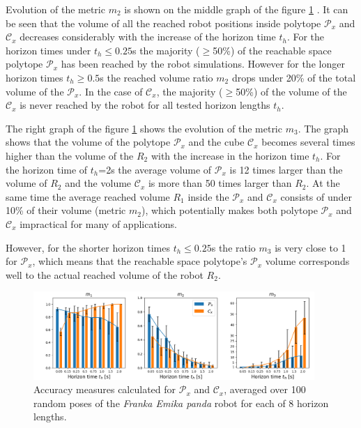 Evolution of the metric $m_2$ is shown on the middle graph of the figure \ref{fig:accuracy} . It can be seen that the volume of all the reached robot positions inside polytope $\mathcal{P}_x$ and $\mathcal{C}_x$ decreases considerably with the increase of the horizon time $t_h$. For the horizon times under $t_h\leq 0.25$s the majority ($\geq$50\%) of the reachable space polytope $\mathcal{P}_x$ has been reached by the robot simulations. However for the longer horizon times $t_h\geq0.5$s the reached volume ratio $m_2$ drops under 20\% of the total volume of the $\mathcal{P}_x$. In the case of $\mathcal{C}_x$, the majority ($\geq$50\%)  of the volume of the $\mathcal{C}_x$ is never reached by the robot for all tested horizon lengths $t_h$. 


The right graph of the figure \ref{fig:accuracy} shows the evolution of the metric $m_3$. The graph shows that the volume of the polytope $\mathcal{P}_x$ and the cube $\mathcal{C}_x$ becomes several times higher than the volume of the $R_2$ with the increase in the horizon time $t_h$. For the horizon time of $t_h$=2s the average volume of $\mathcal{P}_x$ is 12 times larger than the volume of $R_2$ and the volume $\mathcal{C}_x$ is more than 50 times larger than $R_2$. At the same time the average reached volume $R_1$ inside the $\mathcal{P}_x$ and $\mathcal{C}_x$ consists of under 10\% of their volume (metric $m_2$), which potentially makes both polytope $\mathcal{P}_x$ and $\mathcal{C}_x$ impractical for many of applications. 

However, for the shorter horizon times $t_h\leq0.25$s the ratio $m_3$ is very close to 1 for $\mathcal{P}_x$, which means that the reachable space polytope's $\mathcal{P}_x$ volume corresponds well to the actual reached volume of the robot $R_2$.


\begin{figure}[!t]
    \centering
    \includegraphics[width=0.95\textwidth]{Papers/images/metrics_results_double.png}
    \caption{Accuracy measures calculated for $\mathcal{P}_x$ and $\mathcal{C}_x$, averaged over 100 random poses of the \textit{Franka Emika panda} robot for each of 8 horizon lengths.}
    \label{fig:accuracy}
    
\end{figure}


